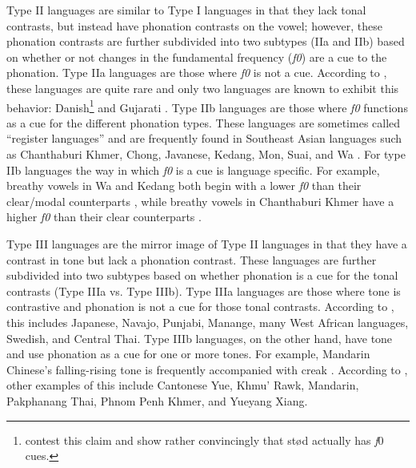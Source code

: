Type II languages are similar to Type I languages in that they lack tonal contrasts, but instead have phonation contrasts on the vowel; however, these phonation contrasts are further subdivided into two subtypes (IIa and IIb) based on whether or not changes in the fundamental frequency (\textit{f0}) are a cue to the phonation. Type IIa languages are those where \textit{f0} is not a cue. According to \citet{espositoCrosslinguisticPatternsPhonation2020}, these languages are quite rare and only two languages are known to exhibit this behavior: Danish\footnote{\citet{frazierPhoneticsYucatecMaya2013,penaStodTimingDomain2022,penaProductionPerceptionStod2024} contest this claim and show rather convincingly that stød actually has \textit{f}0 cues.} \citep{gronnumDanishStodLaryngealization2013} and Gujarati \citep{khanPhoneticsContrastivePhonation2012}. Type IIb languages are those where \textit{f0} functions as a cue for the different phonation types. These languages are sometimes called ``register languages'' and are frequently found in Southeast Asian languages such as Chanthaburi Khmer, Chong, Javanese, Kedang, Mon, Suai, and Wa \citep[e.g.,][]{brunelleTonePhonationSoutheast2016,dicanioPhoneticsRegisterTakhian2009,samelyKedangEasternIndonesia1991,waylandAcousticCorrelatesBreathy2003}. For type IIb languages the way in which \textit{f0} is a cue is language specific. For example, breathy vowels in Wa and Kedang both begin with a lower \textit{f0} than their clear/modal counterparts \citep{samelyKedangEasternIndonesia1991}, while breathy vowels in Chanthaburi Khmer have a higher \textit{f0} than their clear counterparts \citep{waylandAcousticCorrelatesBreathy2003}. 

Type III languages are the mirror image of Type II languages in that they have a contrast in tone but lack a phonation contrast. These languages are further subdivided into two subtypes based on whether phonation is a cue for the tonal contrasts (Type IIIa vs. Type IIIb). Type IIIa languages are those where tone is contrastive and phonation is not a cue for those tonal contrasts. According to \citep{espositoCrosslinguisticPatternsPhonation2020}, this includes Japanese, Navajo, Punjabi, Manange, many West African languages, Swedish, and Central Thai. Type IIIb languages, on the other hand, have tone and use phonation as a cue for one or more tones. For example, Mandarin Chinese's falling-rising tone is frequently accompanied with creak \citep[e.g.,][]{kuangCovariationVoiceQuality2017}.  According to \citep{espositoCrosslinguisticPatternsPhonation2020}, other examples of this include Cantonese Yue, Khmu' Rawk, Mandarin, Pakphanang Thai, Phnom Penh Khmer, and Yueyang Xiang.

